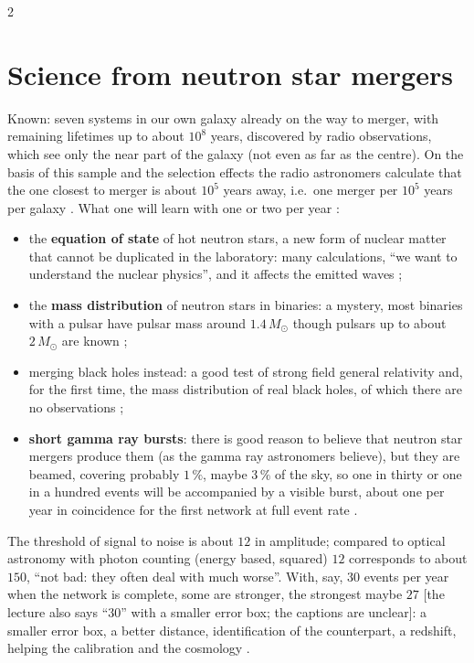 \begin{paracol}{2}
\section{Science from neutron star mergers}\label{sec:c27-ns}

Known: seven systems in our own galaxy already on the way to merger, with remaining lifetimes up to about $10^8$ years, discovered by radio observations, which see only the near part of the galaxy (not even as far as the centre). On the basis of this sample and the selection effects the radio astronomers calculate that the one closest to merger is about $10^5$ years away, i.e.\ one merger per $10^5$ years per galaxy . What one will learn with one or two per year :
\begin{itemize}
  \item the \textbf{equation of state} of hot neutron stars, a new form of nuclear matter that cannot be duplicated in the laboratory: many calculations, ``we want to understand the nuclear physics'', and it affects the emitted waves ;
  \item the \textbf{mass distribution} of neutron stars in binaries: a mystery, most binaries with a pulsar have pulsar mass around $1.4\,M_\odot$ though pulsars up to about $2\,M_\odot$ are known ;
  \item merging black holes instead: a good test of strong field general relativity and, for the first time, the mass distribution of real black holes, of which there are no observations ;
  \item \textbf{short gamma ray bursts}: there is good reason to believe that neutron star mergers produce them (as the gamma ray astronomers believe), but they are beamed, covering probably $1\,\%$, maybe $3\,\%$ of the sky, so one in thirty or one in a hundred events will be accompanied by a visible burst, about one per year in coincidence for the first network at full event rate .
\end{itemize}

The threshold of signal to noise is about $12$ in amplitude; compared to optical astronomy with photon counting (energy based, squared) $12$ corresponds to about $150$, ``not bad: they often deal with much worse''. With, say, $30$ events per year when the network is complete, some are stronger, the strongest maybe $27$ [the lecture also says ``30'' with a smaller error box; the captions are unclear]: a smaller error box, a better distance, identification of the counterpart, a redshift, helping the calibration and the cosmology .


\end{paracol}
